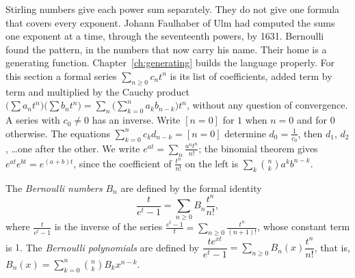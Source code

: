 Stirling numbers give each power sum separately. They do not give one formula that covers every exponent. Johann Faulhaber of Ulm had computed the sums one exponent at a time, through the seventeenth powers, by 1631. Bernoulli found the pattern, in the numbers that now carry his name. Their home is a generating function. Chapter~\ref{ch:generating} builds the language properly. For this section a formal series $\sum_{n\ge0}c_nt^n$ is its list of coefficients, added term by term and multiplied by the Cauchy product
$\bigl(\sum a_nt^n\bigr)\bigl(\sum b_nt^n\bigr)=\sum_n\bigl(\sum_{k=0}^na_kb_{n-k}\bigr)t^n$, without any question of
convergence. A series with $c_0\ne0$ has an inverse. Write $[n=0]$ for $1$ when $n=0$ and for $0$ otherwise. The equations $\sum_{k=0}^nc_kd_{n-k}=[n=0]$ determine $d_0=\frac1{c_0}$,
then $d_1$, $d_2$, \dots one after the other. We write $e^{at}=\sum_n\frac{a^nt^n}{n!}$; the binomial theorem gives
$e^{at}e^{bt}=e^{(a+b)t}$, since the coefficient of $\frac{t^n}{n!}$ on the left is $\sum_k\binom nka^kb^{n-k}$.

\begin{definition}
The \emph{Bernoulli numbers} $B_n$ are defined by the formal identity
\[
\frac t{e^t-1}=\sum_{n\ge0}B_n\frac{t^n}{n!},
\]
where $\frac t{e^t-1}$ is the inverse of the series $\frac{e^t-1}t=\sum_{n\ge0}\frac{t^n}{(n+1)!}$, whose constant term is $1$.
The \emph{Bernoulli polynomials} are defined by $\dfrac{te^{xt}}{e^t-1}=\sum_{n\ge0}B_n(x)\dfrac{t^n}{n!}$, that is,
$B_n(x)=\sum_{k=0}^n\binom nkB_kx^{n-k}$.
\end{definition}

